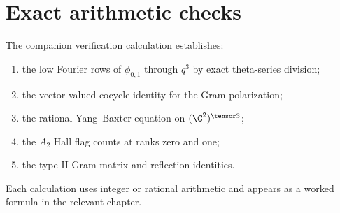 \chapter{Exact arithmetic checks}
The companion verification calculation establishes:
\begin{enumerate}
\item the low Fourier rows of $\phi_{0,1}$ through $q^3$ by exact theta-series division;
\item the vector-valued cocycle identity for the Gram polarization;
\item the rational Yang--Baxter equation on $(\C^2)^{\tensor3}$;
\item the $A_2$ Hall flag counts at ranks zero and one;
\item the type-II Gram matrix and reflection identities.
\end{enumerate}
Each calculation uses integer or rational arithmetic and appears as a worked formula in the relevant chapter.
